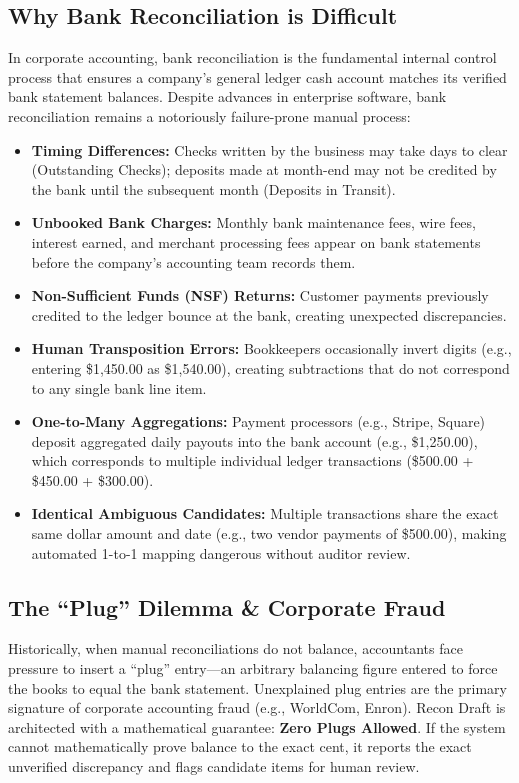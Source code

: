 \documentclass[10pt,a4paper]{article}
\begin{document}
\subsection{Why Bank Reconciliation is Difficult}
In corporate accounting, bank reconciliation is the fundamental internal control process that ensures a company's general ledger cash account matches its verified bank statement balances. Despite advances in enterprise software, bank reconciliation remains a notoriously failure-prone manual process:
\begin{itemize}[noitemsep]
    \item \textbf{Timing Differences:} Checks written by the business may take days to clear (Outstanding Checks); deposits made at month-end may not be credited by the bank until the subsequent month (Deposits in Transit).
    \item \textbf{Unbooked Bank Charges:} Monthly bank maintenance fees, wire fees, interest earned, and merchant processing fees appear on bank statements before the company's accounting team records them.
    \item \textbf{Non-Sufficient Funds (NSF) Returns:} Customer payments previously credited to the ledger bounce at the bank, creating unexpected discrepancies.
    \item \textbf{Human Transposition Errors:} Bookkeepers occasionally invert digits (e.g., entering \$1,450.00 as \$1,540.00), creating subtractions that do not correspond to any single bank line item.
    \item \textbf{One-to-Many Aggregations:} Payment processors (e.g., Stripe, Square) deposit aggregated daily payouts into the bank account (e.g., \$1,250.00), which corresponds to multiple individual ledger transactions (\$500.00 + \$450.00 + \$300.00).
    \item \textbf{Identical Ambiguous Candidates:} Multiple transactions share the exact same dollar amount and date (e.g., two vendor payments of \$500.00), making automated 1-to-1 mapping dangerous without auditor review.
\end{itemize}

\subsection{The ``Plug'' Dilemma \& Corporate Fraud}
Historically, when manual reconciliations do not balance, accountants face pressure to insert a ``plug'' entry—an arbitrary balancing figure entered to force the books to equal the bank statement. Unexplained plug entries are the primary signature of corporate accounting fraud (e.g., WorldCom, Enron). Recon Draft is architected with a mathematical guarantee: \textbf{Zero Plugs Allowed}. If the system cannot mathematically prove balance to the exact cent, it reports the exact unverified discrepancy and flags candidate items for human review.
\end{document}
